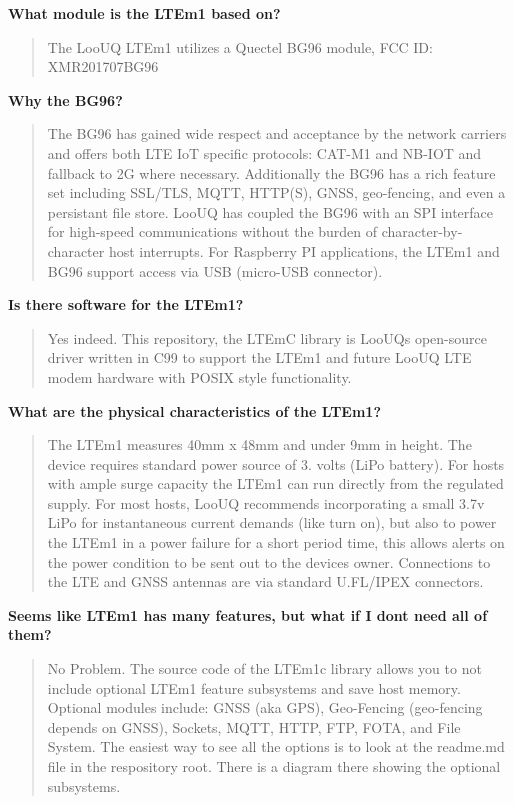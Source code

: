 {\bfseries{What module is the L\+T\+Em1 based on?}} \begin{quote}
The Loo\+UQ L\+T\+Em1 utilizes a Quectel B\+G96 module, F\+CC ID\+: X\+M\+R201707\+B\+G96 \end{quote}


{\bfseries{Why the B\+G96?}} \begin{quote}
The B\+G96 has gained wide respect and acceptance by the network carriers and offers both L\+TE IoT specific protocols\+: C\+A\+T-\/\+M1 and N\+B-\/\+I\+OT and fallback to 2G where necessary. Additionally the B\+G96 has a rich feature set including S\+S\+L/\+T\+LS, M\+Q\+TT, H\+T\+T\+P(\+S), G\+N\+SS, geo-\/fencing, and even a persistant file store. Loo\+UQ has coupled the B\+G96 with an S\+PI interface for high-\/speed communications without the burden of character-\/by-\/character host interrupts. For Raspberry PI applications, the L\+T\+Em1 and B\+G96 support access via U\+SB (micro-\/\+U\+SB connector). \end{quote}


{\bfseries{Is there software for the L\+T\+Em1?}} \begin{quote}
Yes indeed. This repository, the L\+T\+EmC library is Loo\+UQ\textquotesingle{}s open-\/source driver written in C99 to support the L\+T\+Em1 and future Loo\+UQ L\+TE modem hardware with P\+O\+S\+IX style functionality. \end{quote}


{\bfseries{What are the physical characteristics of the L\+T\+Em1?}} \begin{quote}
The L\+T\+Em1 measures 40mm x 48mm and under 9mm in height. The device requires standard power source of 3. volts (Li\+Po battery). For hosts with ample surge capacity the L\+T\+Em1 can run directly from the regulated supply. For most hosts, Loo\+UQ recommends incorporating a small 3.\+7v Li\+Po for instantaneous current demands (like turn on), but also to power the L\+T\+Em1 in a power failure for a short period time, this allows alerts on the power condition to be sent out to the devices owner. Connections to the L\+TE and G\+N\+SS antennas are via standard U.\+FL/\+I\+P\+EX connectors. \end{quote}


{\bfseries{Seems like L\+T\+Em1 has many features, but what if I don\textquotesingle{}t need all of them?}} \begin{quote}
No Problem. The source code of the L\+T\+Em1c library allows you to not include optional L\+T\+Em1 feature subsystems and save host memory. Optional modules include\+: G\+N\+SS (aka G\+PS), Geo-\/\+Fencing (geo-\/fencing depends on G\+N\+SS), Sockets, M\+Q\+TT, H\+T\+TP, F\+TP, F\+O\+TA, and File System. The easiest way to see all the options is to look at the readme.\+md file in the respository root. There is a diagram there showing the optional subsystems. \end{quote}


